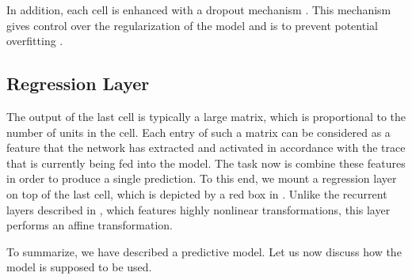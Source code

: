 In addition, each cell is enhanced with a dropout mechanism \cite{zaremba2014}.
This mechanism gives control over the regularization of the model and is to
prevent potential overfitting \cite{hastie2009}.

\subsection{Regression Layer}
The output of the last cell is typically a large matrix, which is proportional
to the number of units in the cell. Each entry of such a matrix can be
considered as a feature that the network has extracted and activated in
accordance with the trace that is currently being fed into the model. The task
now is combine these features in order to produce a single prediction. To this
end, we mount a regression layer on top of the last cell, which is depicted by a
red box in . Unlike the recurrent layers described in
, which features highly nonlinear transformations, this layer
performs an affine transformation.

To summarize, we have described a predictive model. Let us now discuss how the
model is supposed to be used.
